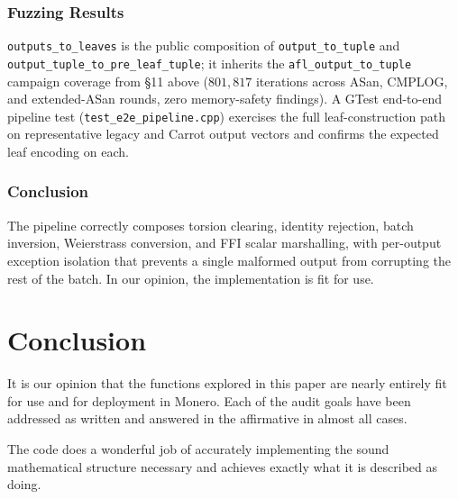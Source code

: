 \documentclass[12pt,titlepage,table]{article}
\begin{document}
\subsubsection{Fuzzing Results}
\verb+outputs_to_leaves+ is the public composition of \verb+output_to_tuple+ and \\\verb+output_tuple_to_pre_leaf_tuple+; it inherits the \verb+afl_output_to_tuple+ campaign coverage from \S 11 above ($801{,}817$ iterations across ASan, CMPLOG, and extended-ASan rounds, zero memory-safety findings).  A GTest end-to-end pipeline test (\verb+test_e2e_pipeline.cpp+) exercises the full leaf-construction path on representative legacy and Carrot output vectors and confirms the expected leaf encoding on each.

\subsubsection[Conclusion]{Conclusion \hfill \checkmark}
The pipeline correctly composes torsion clearing, identity rejection, batch inversion, Weierstrass conversion, and FFI scalar marshalling, with per-output exception isolation that prevents a single malformed output from corrupting the rest of the batch. In our opinion, the implementation is fit for use.

\newpage
\section{Conclusion}
\indent \indent It is our opinion that the functions explored in this paper are nearly entirely fit for use and for deployment in Monero. Each of the audit goals have been addressed as written and answered in the affirmative in almost all cases. 

\medskip
The code does a wonderful job of accurately implementing the sound mathematical structure necessary and achieves exactly what it is described as doing.
\end{document}
